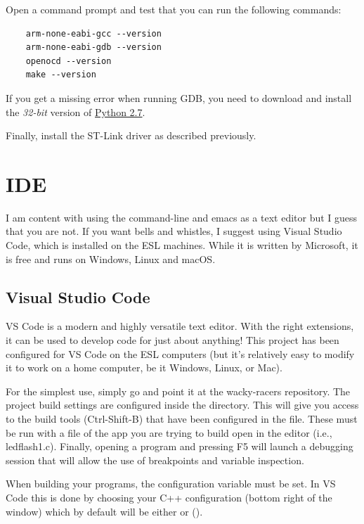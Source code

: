 Open a command prompt and test that you can run the following commands:
\begin{verbatim}
    arm-none-eabi-gcc --version
    arm-none-eabi-gdb --version
    openocd --version
    make --version
\end{verbatim}
If you get a missing  error when running GDB, you need to
download and install the \emph{32-bit} version of
\href{https://www.python.org/downloads/release/python-2718/}{Python 2.7}.

Finally, install the ST-Link driver as described previously.

\section{IDE}

I am content with using the command-line and emacs as a text editor but I
guess that you are not.  If you want bells and whistles, I suggest using
Visual Studio Code, which is installed on the ESL machines.  While it is
written by Microsoft, it is free and runs on Windows, Linux and macOS.


\subsection{Visual Studio Code}
\label{vs-code}

VS Code is a modern and highly versatile text editor.  With the right
extensions, it can be used to develop code for just about anything!
This project has been configured for VS Code on the ESL computers (but
it's relatively easy to modify it to work on a home computer, be it
Windows, Linux, or Mac).

For the simplest use, simply go  and point
it at the wacky-racers repository. The project build settings are
configured inside the  directory. This will give you
access to the build tools (Ctrl-Shift-B) that have been configured in
the  file. These must be run with a file of
the app you are trying to build open in the editor (i.e.,
ledflash1.c). Finally, opening a program and pressing F5 will launch a
debugging session that will allow the use of breakpoints and variable
inspection.

When building your programs, the  configuration variable
must be set. In VS Code this is done by choosing your C++
configuration (bottom right of the window) which by default will be
either  or  ().

